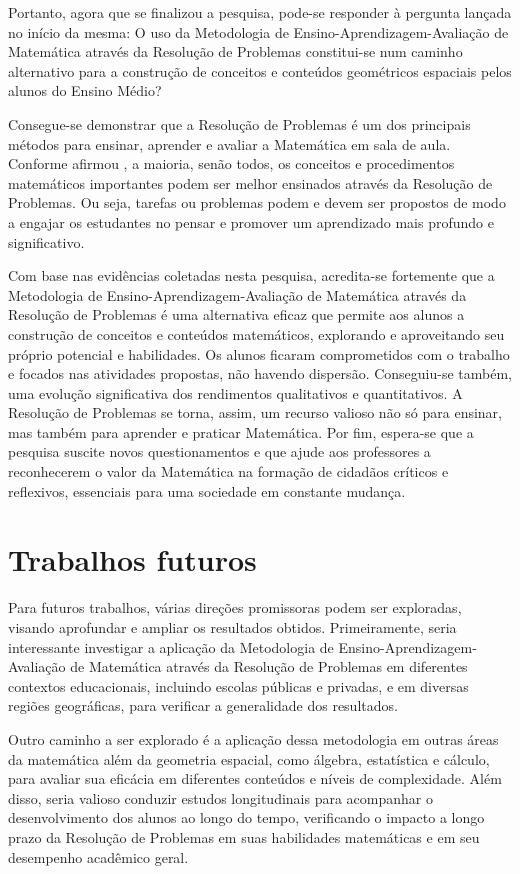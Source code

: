 Portanto, agora que se finalizou a pesquisa, pode-se responder à pergunta lançada no início da mesma: O uso da Metodologia de Ensino-Aprendizagem-Avaliação de Matemática através da Resolução de Problemas constitui-se num caminho alternativo para a construção de conceitos e conteúdos geométricos espaciais pelos alunos do Ensino Médio?

Consegue-se demonstrar que a Resolução de Problemas é um dos principais métodos para ensinar, aprender e avaliar a Matemática em sala de aula. Conforme afirmou , a maioria, senão todos, os conceitos e procedimentos matemáticos importantes podem ser melhor ensinados através da Resolução de Problemas. Ou seja, tarefas ou problemas podem e devem ser propostos de modo a engajar os estudantes no pensar e promover um aprendizado mais profundo e significativo.

Com base nas evidências coletadas nesta pesquisa, acredita-se fortemente que a Metodologia de Ensino-Aprendizagem-Avaliação de Matemática através da Resolução de Problemas é uma alternativa eficaz que permite aos alunos a construção de conceitos e conteúdos matemáticos, explorando e aproveitando seu próprio potencial e habilidades. Os alunos ficaram comprometidos com o trabalho e focados nas atividades propostas, não havendo dispersão. Conseguiu-se também, uma evolução significativa dos rendimentos qualitativos e quantitativos. A Resolução de Problemas se torna, assim, um recurso valioso não só para ensinar, mas também para aprender e praticar Matemática. Por fim, espera-se que a pesquisa suscite novos questionamentos e que ajude aos professores a reconhecerem o valor da Matemática na formação de cidadãos críticos e reflexivos, essenciais para uma sociedade em constante mudança.

\section{Trabalhos futuros}

Para futuros trabalhos, várias direções promissoras podem ser exploradas, visando aprofundar e ampliar os resultados obtidos. Primeiramente, seria interessante investigar a aplicação da Metodologia de Ensino-Aprendizagem-Avaliação de Matemática através da Resolução de Problemas em diferentes contextos educacionais, incluindo escolas públicas e privadas, e em diversas regiões geográficas, para verificar a generalidade dos resultados.

Outro caminho a ser explorado é a aplicação dessa metodologia em outras áreas da matemática além da geometria espacial, como álgebra, estatística e cálculo, para avaliar sua eficácia em diferentes conteúdos e níveis de complexidade. Além disso, seria valioso conduzir estudos longitudinais para acompanhar o desenvolvimento dos alunos ao longo do tempo, verificando o impacto a longo prazo da Resolução de Problemas em suas habilidades matemáticas e em seu desempenho acadêmico geral.

